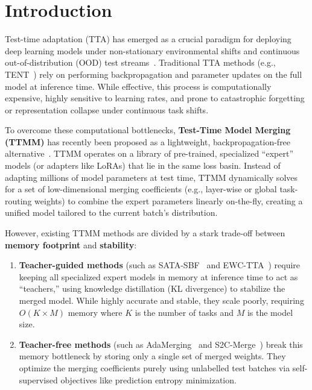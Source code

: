 \documentclass{article}
\theoremstyle{plain}
\theoremstyle{definition}
\theoremstyle{remark}
\begin{document}
\section{Introduction}
\label{submission-introduction}

Test-time adaptation (TTA) has emerged as a crucial paradigm for deploying deep learning models under non-stationary environmental shifts and continuous out-of-distribution (OOD) test streams~\cite{wang2021tent, liang2020shot}. Traditional TTA methods (e.g., TENT~\cite{wang2021tent}) rely on performing backpropagation and parameter updates on the full model at inference time. While effective, this process is computationally expensive, highly sensitive to learning rates, and prone to catastrophic forgetting or representation collapse under continuous task shifts.

To overcome these computational bottlenecks, \textbf{Test-Time Model Merging (TTMM)} has recently been proposed as a lightweight, backpropagation-free alternative~\cite{yang2024adamerging, s2cmerge2026}. TTMM operates on a library of pre-trained, specialized ``expert'' models (or adapters like LoRAs) that lie in the same loss basin. Instead of adapting millions of model parameters at test time, TTMM dynamically solves for a set of low-dimensional merging coefficients (e.g., layer-wise or global task-routing weights) to combine the expert parameters linearly on-the-fly, creating a unified model tailored to the current batch's distribution.

However, existing TTMM methods are divided by a stark trade-off between \textbf{memory footprint} and \textbf{stability}:
\begin{enumerate}
    \item \textbf{Teacher-guided methods} (such as SATA-SBF~\cite{sata2026} and EWC-TTA~\cite{ewctta2026}) require keeping all specialized expert models in memory at inference time to act as ``teachers,'' using knowledge distillation (KL divergence) to stabilize the merged model. While highly accurate and stable, they scale poorly, requiring $O(K \times M)$ memory where $K$ is the number of tasks and $M$ is the model size.
    \item \textbf{Teacher-free methods} (such as AdaMerging~\cite{yang2024adamerging} and S2C-Merge~\cite{s2cmerge2026}) break this memory bottleneck by storing only a single set of merged weights. They optimize the merging coefficients purely using unlabelled test batches via self-supervised objectives like prediction entropy minimization.
\end{enumerate}
\end{document}
